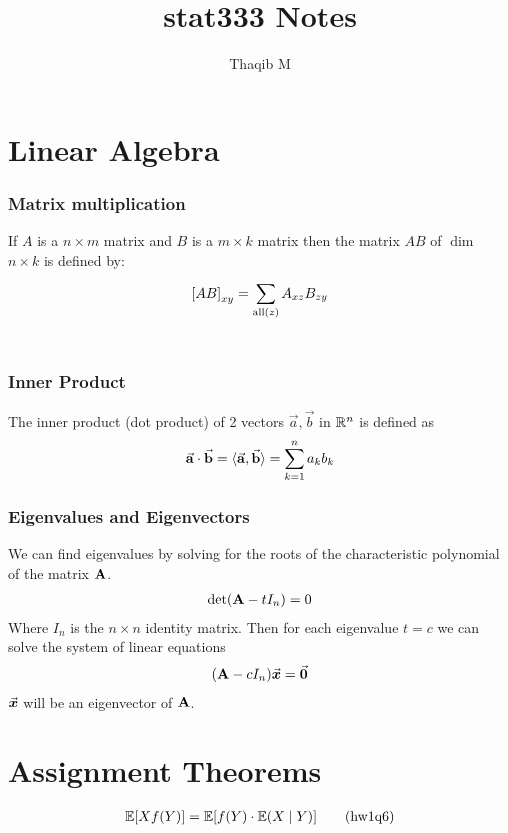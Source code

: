 \documentclass[12pt,a4paper]{article}
\author{Thaqib M}
\title{stat333 Notes}
\begin{document}
\maketitle
\newpage
\section*{Linear Algebra}
\subsubsection*{Matrix multiplication} If $A$ is a $n\times m$ matrix and $B$ is a $m\times k$ matrix then the matrix $AB$ of $\dim$ $n\times k$ is defined by: 
\begin{align*}
{\bf[}AB{\bf]}_{xy} = \sum\limits_{\mathrm{all}(z)}^{}A_{xz}B_{zy}
\end{align*}
\\
\subsubsection*{Inner Product} The inner product (dot product) of 2 vectors $\vec{a}, \vec{b}$ in $\mathbb{R}^n$ is defined as
\begin{align*}
\va{a}\cdot \va{b} = \langle\va{a},\va{b}\rangle = \sum\limits_{k=1}^{n}a_kb_k
\end{align*}
\subsubsection*{Eigenvalues and Eigenvectors}
We can find eigenvalues by solving for the roots of the characteristic polynomial of the matrix $\vb A$.
\begin{align*}
\det(\vb A-tI_n) = 0
\end{align*}
Where $I_n$ is the $n\times n$ identity matrix.
Then for each eigenvalue $t=c$ we can solve the system of linear equations 
\begin{align*}
(\vb A - cI_n)\va* x = \va* 0
\end{align*}
$\va* x$ will be an eigenvector of $\vb A$. 
\newpage
\section*{Assignment Theorems}
\begin{align*}
\mathbb{E}[Xf(Y)] = \mathbb{E}[f(Y)\cdot\mathbb{E}(X\;\vert\; Y)] \tag{hw1q6}
\end{align*}
\newpage
\end{document}
